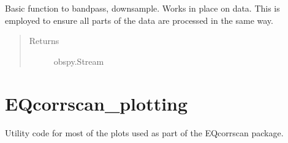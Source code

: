 \documentclass[a4paper,10pt,english]{sphinxmanual}
\begin{document}
\begin{fulllineitems}
\label{modules:pre_processing.shortproc}
Basic function to bandpass, downsample.  Works in place
on data.  This is employed to ensure all parts of the data are processed
in the same way.
\begin{quote}\begin{description}
\item[{Returns}] \leavevmode
obspy.Stream

\end{description}\end{quote}

\end{fulllineitems}



\section{EQcorrscan\_plotting}
\label{modules:module-EQcorrscan_plotting}\label{modules:eqcorrscan-plotting}
Utility code for most of the plots used as part of the EQcorrscan package.
\end{document}
